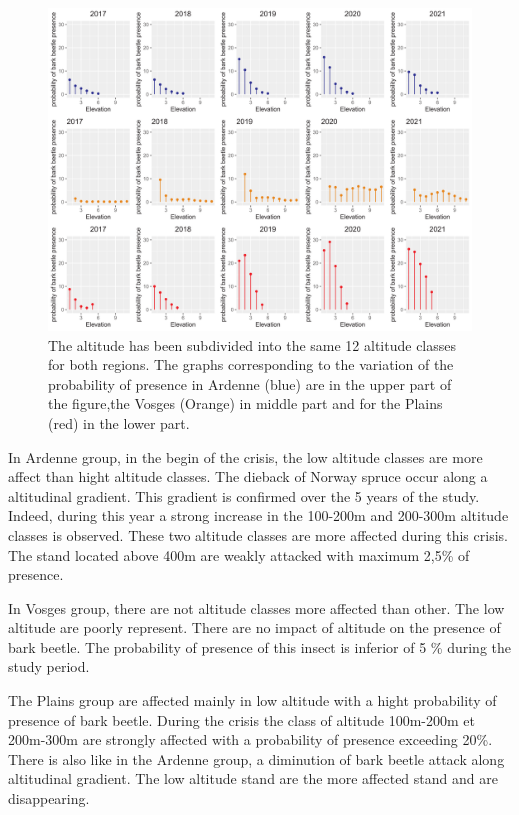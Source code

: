 \documentclass[3p,procedia]{elsarticle}
\begin{document}
\begin{figure}
\centering
	\includegraphics[width=\textwidth]{synthese_color_06_2022.png}
     \caption{The altitude has been subdivided into the same 12 altitude classes for both regions. 
The graphs corresponding to the variation of the probability of presence in Ardenne (blue) are in the upper part of the figure,the Vosges (Orange) in middle part and for the Plains (red) in the lower part.
}
	\label{alti_sco}
\end{figure}

In Ardenne group, in the begin of the crisis, the low altitude classes are more affect than hight altitude classes.
The dieback of Norway spruce occur along a altitudinal  gradient.
This gradient is confirmed over the 5 years of the study.
Indeed, during this year a strong increase in the 100-200m and 200-300m altitude classes is observed. 
These two altitude classes are more affected during this crisis.
The stand located above 400m are weakly attacked with maximum 2,5\% of presence.

In Vosges group, there are not altitude classes more affected than other. 
The low altitude are poorly represent. There are no impact of altitude on the presence of bark beetle. 
The probability of presence of this insect is inferior of 5 \% during the study period.

The Plains group are affected mainly in low altitude with a hight probability of presence of bark beetle. 
During the crisis the class of altitude 100m-200m et 200m-300m are strongly affected with a probability of presence exceeding 20\%.
There is also like in the Ardenne group, a diminution of bark beetle attack along altitudinal gradient.
The low altitude stand are the more affected stand and are disappearing.
\end{document}

